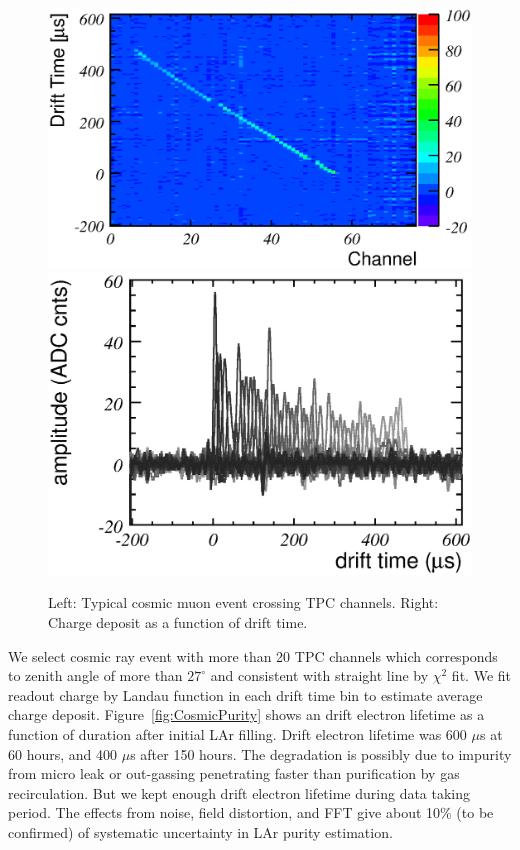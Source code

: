 \begin{figure}[htbp]
 \begin{center}
  \includegraphics[width=0.49\hsize]{fig/cosmic68_ev258_display.eps}
  \includegraphics[width=0.49\hsize]{fig/cosmic68_ev258.eps}
 \end{center}
 \caption{Left: Typical cosmic muon event crossing TPC channels. Right: Charge deposit as a function of drift time.}
 \label{fig:CosmicEvent}
\end{figure}

We select cosmic ray event with more than 20 TPC channels which corresponds to zenith angle of more than $27^\circ$ and consistent with straight line by $\chi^2$ fit. 
We fit readout charge by Landau function in each drift time bin to estimate average charge deposit. 
Figure~\ref{fig:CosmicPurity} shows an drift electron lifetime as a function of duration after initial LAr filling.
Drift electron lifetime was 600 $\mu$s at 60 hours, and 400 $\mu$s after 150 hours.
The degradation is possibly due to impurity from micro leak or out-gassing penetrating faster than purification by gas recirculation.
But we kept enough drift electron lifetime during data taking period.
The effects from noise, field distortion, and FFT give about 10\% (to be confirmed) of systematic uncertainty in LAr purity estimation.

